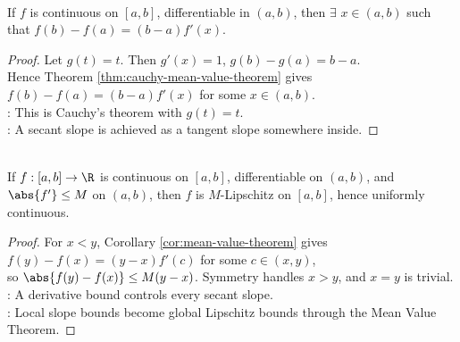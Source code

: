 \begin{corollary} \label{cor:mean-value-theorem} \\
If $f$ is continuous on $[a,b]$, differentiable in $(a,b)$, then $\exists$ $x\in(a,b)$ such that $f(b)-f(a)=(b-a)f'(x)$.
\begin{proof}
Let $g(t)=t$. Then $g'(x)=1$, $g(b)-g(a)=b-a$.\\
Hence Theorem \ref{thm:cauchy-mean-value-theorem} gives $f(b)-f(a)=(b-a)f'(x)$ for some $x\in(a,b)$.\\
: This is Cauchy's theorem with $g(t)=t$.\\
: A secant slope is achieved as a tangent slope somewhere inside.
\end{proof}
\end{corollary}

\begin{corollary} \label{cor:bounded-derivative-lipschitz-one-variable} \\
If $f:[a,b]\to\R$ is continuous on $[a,b]$, differentiable on $(a,b)$, and $\abs{f'}\leq M$ on $(a,b)$, then $f$ is $M$-Lipschitz on $[a,b]$, hence uniformly continuous.
\begin{proof}
For $x<y$, Corollary \ref{cor:mean-value-theorem} gives $f(y)-f(x)=(y-x)f'(c)$ for some $c\in(x,y)$,\\
so $\abs{f(y)-f(x)}\leq M(y-x)$. Symmetry handles $x>y$, and $x=y$ is trivial.\\
: A derivative bound controls every secant slope.\\
: Local slope bounds become global Lipschitz bounds through the Mean Value Theorem.
\end{proof}
\end{corollary}

